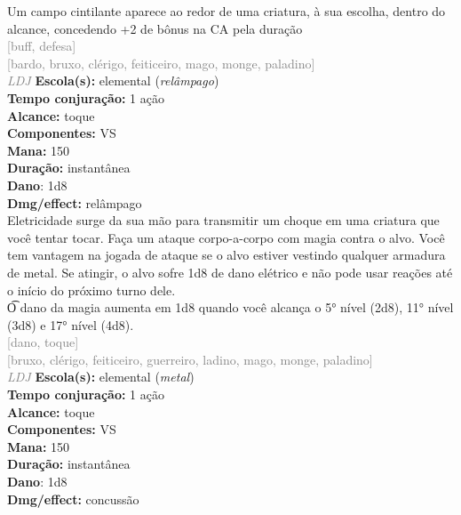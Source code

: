 \documentclass{RPG_Adventure}[2021/10/20]
\begin{document}
{\normalsize Um campo cintilante aparece ao redor de uma criatura, à sua escolha, dentro do alcance, concedendo +2 de bônus na CA pela duração\\}
{\scriptsize \textcolor{gray}{[buff, defesa]\\}}
{\scriptsize \textcolor{gray}{[bardo, bruxo, clérigo, feiticeiro, mago, monge, paladino]\\}}
{\tiny \textcolor{gray}{\textit{LDJ}}}
{\small \t \textbf{Escola(s):} elemental (\textit{relâmpago})\\\t \textbf{Tempo conjuração:} 1 ação\\\t \textbf{Alcance:} toque\\\t \textbf{Componentes:} VS\\\t \textbf{Mana:} 150\\\t \textbf{Duração:} instantânea\\\t \textbf{Dano}: 1d8\\\t \textbf{Dmg/effect:} relâmpago\\}
{\normalsize Eletricidade surge da sua mão para transmitir um choque em uma criatura que você tentar tocar. Faça um ataque corpo-a-corpo com magia contra o alvo. Você tem vantagem na jogada de ataque se o alvo estiver vestindo qualquer armadura de metal. Se atingir, o alvo sofre 1d8 de dano elétrico e não pode usar reações até o início do próximo turno dele.\\\t O dano da magia aumenta em 1d8 quando você alcança o 5° nível (2d8), 11° nível (3d8) e 17° nível (4d8).\\}
{\scriptsize \textcolor{gray}{[dano, toque]\\}}
{\scriptsize \textcolor{gray}{[bruxo, clérigo, feiticeiro, guerreiro, ladino, mago, monge, paladino]\\}}
{\tiny \textcolor{gray}{\textit{LDJ}}}
{\small \t \textbf{Escola(s):} elemental (\textit{metal})\\\t \textbf{Tempo conjuração:} 1 ação\\\t \textbf{Alcance:} toque\\\t \textbf{Componentes:} VS\\\t \textbf{Mana:} 150\\\t \textbf{Duração:} instantânea\\\t \textbf{Dano}: 1d8\\\t \textbf{Dmg/effect:} concussão\\}
\end{document}
